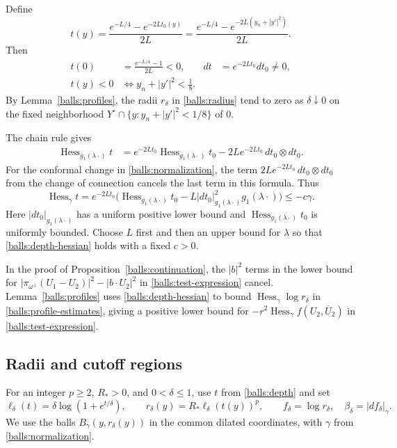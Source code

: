 \documentclass[11pt,a4paper]{article}
\theoremstyle{definition}
\theoremstyle{remark}
\numberwithin{equation}{section}
\begin{document}
Define
\begin{equation}\label{balls:depth}
 t(y)=\frac{e^{-L/4}-e^{-2Lt_0(y)}}{2L}
     =\frac{e^{-L/4}-e^{-2L(y_n+|y'|^2)}}{2L}.
\end{equation}
Then
\begin{align*}
 t(0)&=\frac{e^{-L/4}-1}{2L}<0,
 & dt&=e^{-2Lt_0}dt_0\ne0,\\
 t(y)<0&\Longleftrightarrow y_n+|y'|^2<\frac18.
\end{align*}
By Lemma~\ref{balls:profiles}, the radii $r_\delta$ in \eqref{balls:radius}
tend to zero as $\delta\downarrow0$ on the fixed neighborhood
$Y^\circ\cap\{y:y_n+|y'|^2<1/8\}$ of $0$.

The chain rule gives
\begin{align*}
 \operatorname{Hess}_{g_1(\lambda\cdot)}t
 &=e^{-2Lt_0}\operatorname{Hess}_{g_1(\lambda\cdot)}t_0
   -2Le^{-2Lt_0}\,dt_0\otimes dt_0.
\end{align*}
For the conformal change in \eqref{balls:normalization}, the term
$2Le^{-2Lt_0}\,dt_0\otimes dt_0$ from the change of connection
cancels the last term in this formula. Thus
\begin{equation}\label{balls:depth-hessian}
 \operatorname{Hess}_{\gamma}t
 =e^{-2Lt_0}\bigl(
    \operatorname{Hess}_{g_1(\lambda\cdot)}t_0
       -L|dt_0|_{g_1(\lambda\cdot)}^2g_1(\lambda\cdot)\bigr)
 \leq-c\gamma.
\end{equation}
Here $|dt_0|_{g_1(\lambda\cdot)}$ has a uniform positive lower bound and
$\operatorname{Hess}_{g_1(\lambda\cdot)}t_0$ is uniformly bounded.
Choose $L$ first and then an upper bound for $\lambda$ so that
\eqref{balls:depth-hessian} holds with a fixed $c>0$.

In the proof of Proposition~\ref{balls:continuation}, the $|b|^2$
terms in the lower bound for
$|\pi_{\omega^\perp}(U_1-U_2)|^2-|b\cdot U_2|^2$ in
\eqref{balls:test-expression} cancel. Lemma~\ref{balls:profiles} uses
\eqref{balls:depth-hessian} to bound $\operatorname{Hess}_\gamma\log r_\delta$
in \eqref{balls:profile-estimates}, giving a positive lower bound for
$-r^2\operatorname{Hess}_\gamma f(U_2,\overline U_2)$ in
\eqref{balls:test-expression}.

\subsection{Radii and cutoff regions}

For an integer $p\geq2$, $R_*>0$, and $0<\delta\leq1$, use $t$ from
\eqref{balls:depth} and set
\begin{equation}\label{balls:radius}
 \ell_\delta(t)=\delta\log(1+e^{t/\delta}),\qquad
 r_\delta(y)=R_*\ell_\delta(t(y))^p,
 \qquad f_\delta=\log r_\delta,\quad
 \beta_\delta=|df_\delta|_\gamma.
\end{equation}
We use the balls $B_\gamma(y,r_\delta(y))$ in the common dilated
coordinates, with $\gamma$ from \eqref{balls:normalization}.
\end{document}
